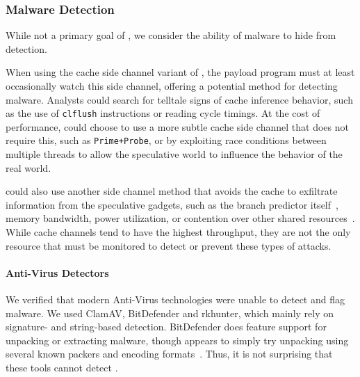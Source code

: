 \subsubsection{Malware Detection}
\label{subsubsec:malware}
While not a primary goal of \speculake, we consider the ability of \speculake
malware to hide from detection.

When using the cache side channel variant of \speculake, the payload
program must at least occasionally watch this side channel, offering a
potential method for detecting \speculake malware.
Analysts could search for telltale signs of cache inference behavior, such as
the use of \texttt{clflush} instructions or reading cycle timings. At the cost
of performance, \speculake could choose to use a more subtle cache side channel
that does not require this, such as \texttt{Prime+Probe}, or by exploiting race
conditions between multiple threads to allow the speculative world to influence
the behavior of the real world.

\speculake could also use another side channel method that
avoids the cache
to exfiltrate information from the speculative gadgets, such as the branch
predictor itself~\cite{evtyushkin2018branchscope}, memory bandwidth, power
utilization, or contention over other shared resources~\cite{kiriansky2018speculative}.
While cache 
channels tend to have the highest throughput, they are not the only 
resource that must be monitored to detect or prevent these types of attacks. 

\paragraph{Anti-Virus Detectors}
We verified that modern Anti-Virus technologies were unable to detect
and flag \speculake malware. We used ClamAV, BitDefender and rkhunter, which
mainly rely on signature- and string-based detection. BitDefender does feature
support for unpacking or extracting malware, though appears to simply try
unpacking using several known packers and encoding formats~\cite{BitDefender}.
Thus, it is not surprising that these tools cannot detect
\speculake.

